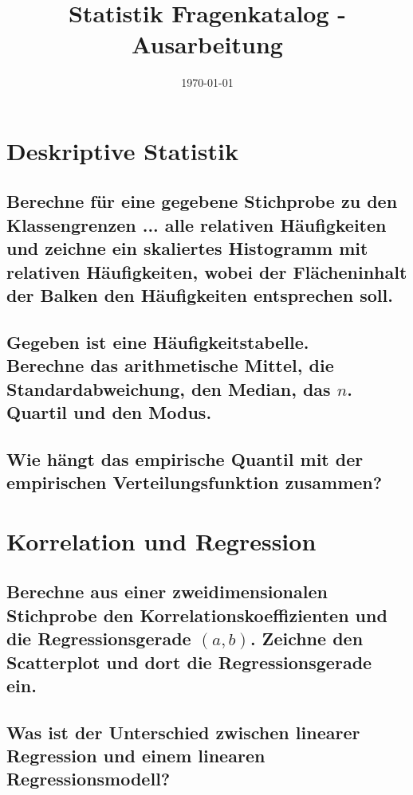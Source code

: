 \documentclass[a4paper,10pt]{article}
\title{Statistik Fragenkatalog - Ausarbeitung}
\author{}
\date{\today}
\begin{document}
  \maketitle
  \newpage
  \tableofcontents{}
  \newpage
\section{Deskriptive Statistik}
\subsection{Berechne für eine gegebene Stichprobe zu den Klassengrenzen ... alle relativen Häufigkeiten und zeichne ein skaliertes Histogramm mit relativen Häufigkeiten, wobei der Flächeninhalt der Balken den Häufigkeiten entsprechen soll.}

\subsection{Gegeben ist eine Häufigkeitstabelle. \\
Berechne das arithmetische Mittel, die Standardabweichung, den Median, das $n$. Quartil und den Modus.}

\subsection{Wie hängt das empirische Quantil mit der empirischen Verteilungsfunktion zusammen?}

\newpage
\section{Korrelation und Regression}
\subsection{Berechne aus einer zweidimensionalen Stichprobe den Korrelationskoeffizienten und die Regressionsgerade $(a, b)$. Zeichne den Scatterplot und dort die Regressionsgerade ein.}

\subsection{Was ist der Unterschied zwischen linearer Regression und einem linearen Regressionsmodell?}
\end{document}
